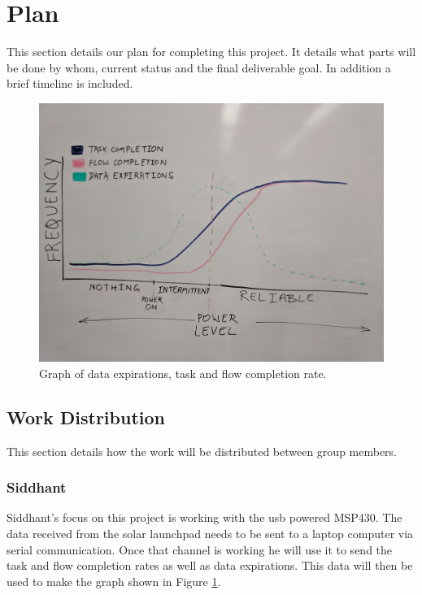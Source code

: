 \section{Plan} %
\label{sec:plan}

This section details our plan for completing this project.
It details what parts will be done by whom, current status and the final deliverable goal.
In addition a brief timeline is included.

\begin{figure}[!ht] %
\centering
\includegraphics[width=1.0\linewidth]{Figures/graph.jpg}
\caption{
 Graph of data expirations, task and flow completion rate.
}
\label{f:graph}
\end{figure}



\subsection{Work Distribution}

This section details how the work will be distributed between group members.

\subsubsection{Siddhant}
Siddhant's focus on this project is working with the usb powered MSP430.
The data received from the solar launchpad needs to be sent to a laptop computer via serial communication.
Once that channel is working he will use it to send the task and flow completion rates as well as data expirations.
This data will then be used to make the graph shown in Figure \ref{f:graph}.

